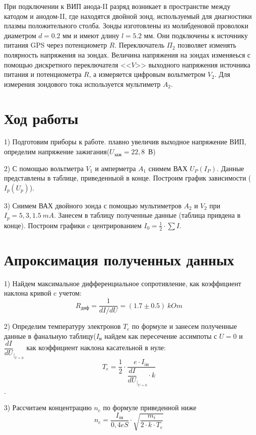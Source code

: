 При подключении к ВИП анода-II разряд возникает в пространстве между катодом и анодом-II, где находятся двойной зонд, используемый для диагностики плазмы положительного столба. Зонды изготовлены из молибденовой проволоки диаметром $d = 0.2$ мм и имеют длину $l = 5.2$ мм. Они подключены к источнику питания GPS через потенциометр $R$. Переключатель $\Pi_2$ позволяет изменять полярность напряжения на зондах. Величина напряжения на зондах изменяеься с помощью дискретного переключателя <<$V$>> выходного напряжения источника питания и потенциометра $R$, а измеряется цифровым вольтметром $V_2$. Для измерения зондового тока используется мультиметр $A_2$.


\section{{Ход работы}}

1) Подготовим приборы к работе. плавно увеличив выходное напряжение ВИП, определим напряжение зажигания($U_{\text{заж}} = 22,8$\ В)

2) С помощью вольтметра $V_1$ и амперметра $A_1$ снимем ВАХ $U_P(I_P)$. Данные представлены в таблице, приведенныой в конце. Построим график зависимости ($I_p(U_p)$).

3) Снимем ВАХ двойного зонда с помощью мультиметров $A_2$ и $V_2$ при $I_p = 5, 3, 1.5\ mA$.
Занесем в таблицу полученные данные (таблица привдена в конце). Построим графики c центрированием $I_0 = \frac{1}{2}\cdot \sum I$.



\section{{Апроксимация полученных данных}}

1) Найдем максимальное дифференциальное сопротивление, как коэффициент наклона кривой c учетом: 
\[R_{\text{диф}} = \frac{1}{dI/dU} = (1.7 \pm 0.5)\ kOm\]

2) Определим температуру электронов $T_e$ по формуле и занесем полученные данные в фанальную таблицу($I_\text{н}$ найдем как пересечение ассимпоты с $U = 0$ и $\dfrac{dI}{dU}_{|_{U=0}}$ как коэффициент наклона касательной в нуле:
\[T_e = \dfrac{1}{2} \cdot \dfrac{e\cdot I_{i \text{н}}}{\dfrac{dI}{dU}_{|_{U=0}}\cdot k} \].

3) Рассчитаем концентрацию $n_e$ по формуле приведенной ниже
\[n_e = \dfrac{I_{i \text{н}}}{0,4eS} \cdot \sqrt{\dfrac{m_i}{2\cdot k\cdot T_e}}\]


